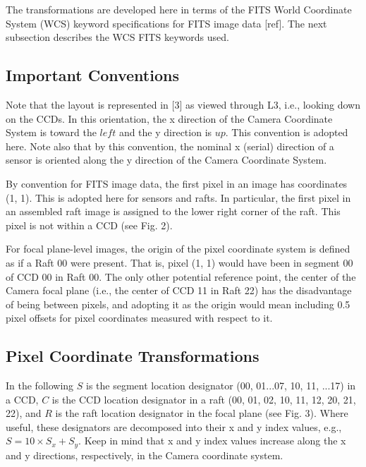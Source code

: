 \documentclass{article}[12pt]
\begin{document}
The transformations are developed here in terms of the FITS World Coordinate System (WCS) keyword specifications for FITS image data [ref].  The next subsection describes the WCS FITS keywords used.




\subsection{Important Conventions}
Note that the layout is represented in [3] as viewed through L3, i.e., looking down on the CCDs.  In this orientation, the x direction of the Camera Coordinate System is toward the $left$ and the y direction is $up$.  This convention is adopted here.  Note also that by this convention, the nominal x (serial) direction of a sensor is oriented along the y direction of the Camera Coordinate System.  

By convention for FITS image data, the first pixel in an image has coordinates (1, 1).  This is adopted here for sensors and rafts.  In particular, the first pixel in an assembled raft image is assigned to the lower right corner of the raft.  This pixel is not within a CCD (see Fig. 2). 

For focal plane-level images, the origin of the pixel coordinate system is defined as if a Raft 00 were present.  That is, pixel (1, 1) would have been in segment 00 of CCD 00 in Raft 00.  The only other potential reference point, the center of the Camera focal plane (i.e., the center of CCD 11 in Raft 22) has the disadvantage of being between pixels, and adopting it as the origin would mean including 0.5 pixel offsets for pixel coordinates measured with respect to it.

\subsection{Pixel Coordinate Transformations}
In the following $S$ is the segment location designator (00, 01...07, 10, 11, ...17) in a CCD, $C$ is the CCD location designator in a raft (00, 01, 02, 10, 11, 12, 20, 21, 22), and $R$ is the raft location designator in the focal plane (see Fig. 3).  Where useful, these designators are decomposed into their x and y index values, e.g., $S = 10 \times S_x + S_y$.  Keep in mind that x and y index values increase along the x and y directions, respectively, in the Camera coordinate system.
\end{document}

